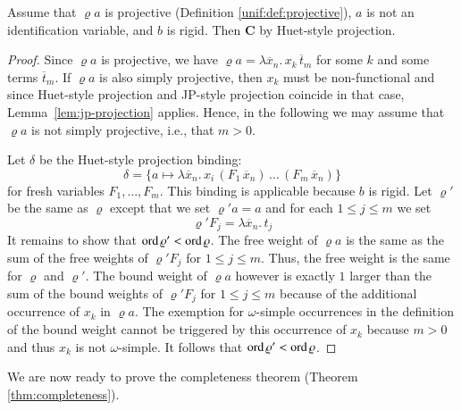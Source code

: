     \begin{lemma}
    \label{lem:huet-projection}
    Assume that $\varrho a$ is
    projective (Definition \ref{unif:def:projective}),
    $a$ is not an identification variable, and $b$ is rigid.
    Then \textbf{C} by Huet-style projection.
    \end{lemma}
    \begin{proof}
    Since $\varrho a$ is
    projective, we have $\varrho a = \lambda \overline{x}_n.\, x_k\,\overline{t}_m$
    for some $k$ and some terms $\overline{t}_m$.
    If $\varrho a$ is also simply projective,
    then $x_k$ must be non-functional
    and since Huet-style projection and JP-style projection coincide
    in that case, Lemma~\ref{lem:jp-projection} applies.
    Hence, in the following we may assume that $\varrho a$ is not simply projective,
    i.e., that $m>0$.
    
    Let $\delta$ be
    the Huet-style projection binding:
    \[ \delta = \{a \mapsto \lambda \overline{x}_n. \, x_i \, (F_1 \, \overline{x}_n) \, \ldots \, (F_m \, \overline{x}_n)\} \]
    for fresh variables $F_1,\dots,F_m$.
    This binding is applicable because $b$ is rigid.
    Let $\varrho'$ be the same as $\varrho$ except that we set $\varrho' a = a$
    and for each $1\leq j\leq m$ we set
    \[
      \varrho' F_j = \lambda \overline{x}_n. \, t_j
    \]
    It remains to show that $\operatorname{ord}\varrho'<\operatorname{ord}\varrho$.
    The free weight of $\varrho a$ is the same as 
    the sum of the free weights of $\varrho' F_j$ for $1\leq j\leq m$.
    Thus, the free weight is the same for $\varrho$ and $\varrho'$.
    The bound weight of $\varrho a$ however is exactly $1$ larger than
    the sum of the bound weights of $\varrho' F_j$ for $1\leq j\leq m$
    because of the additional occurrence of $x_k$ in $\varrho a$.
    The exemption for $\omega$-simple occurrences in the definition
    of the bound weight cannot be triggered by this occurrence of $x_k$
    because $m > 0$ and thus $x_k$ is not $\omega$-simple.
    It follows that $\operatorname{ord}\varrho'<\operatorname{ord}\varrho$.
    \end{proof}
    We are now ready to prove the completeness theorem (Theorem \ref{thm:completeness}).
